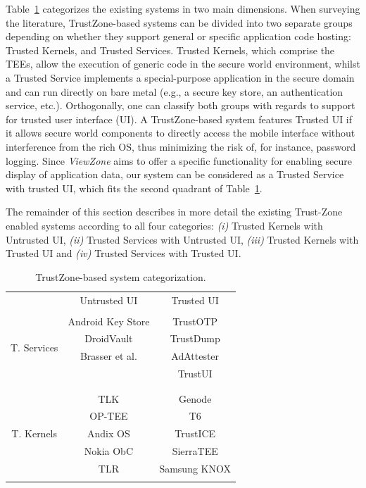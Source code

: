 Table~\ref{tab:trustzonesystemscomparison} categorizes the existing systems in two main dimensions. When surveying the literature, TrustZone-based systems can be divided into two separate groups depending on whether they support general or specific application code hosting: Trusted Kernels, and Trusted Services. Trusted Kernels, which comprise the TEEs, allow the execution of generic code in the secure world environment, whilst a Trusted Service implements a special-purpose application in the secure domain and can run directly on bare metal (e.g., a secure key store, an authentication service, etc.). Orthogonally, one can classify both groups with regards to support for trusted user interface (UI). A TrustZone-based system features Trusted UI if it allows secure world components to directly access the mobile interface without interference from the rich OS, thus minimizing the risk of, for instance, password logging. Since \emph{ViewZone} aims to offer a specific functionality for enabling secure display of application data, our system can be considered as a Trusted Service with trusted UI, which fits the second quadrant of Table~\ref{tab:trustzonesystemscomparison}.

The remainder of this section describes in more detail the existing Trust-Zone enabled systems according to all four categories: \emph{(i)} Trusted Kernels with Untrusted UI, \emph{(ii)} Trusted Services with Untrusted UI, \emph{(iii)} Trusted Kernels with Trusted UI and \emph{(iv)} Trusted Services with Trusted UI.

\begin{table}[t!]
	\caption{TrustZone-based system categorization.}
	\label{tab:trustzonesystemscomparison}
	\centering
	\begin{tabular}{ c|c|c| }
		\multicolumn{1}{c}{} 				& \multicolumn{1}{c}{Untrusted UI} 	& \multicolumn{1}{c}{Trusted UI} \\ \cline{2-3}
		\multirow{6}{*}{T. Services} 	&									& \\
		& Android Key Store					& TrustOTP \\
		& DroidVault 						& TrustDump \\
		& Brasser et al.					& AdAttester \\
		& 									& TrustUI \\
		&									& \\
		\cline{2-3}
		\multirow{7}{*}{T. Kernels}	&									& \\
		& TLK								& Genode \\
		& OP-TEE 							& T6 \\
		& Andix OS							& TrustICE \\
		& Nokia ObC							& SierraTEE \\
		& TLR 								& Samsung KNOX \\
		&									& \\
		\cline{2-3}
	\end{tabular}
\end{table}

